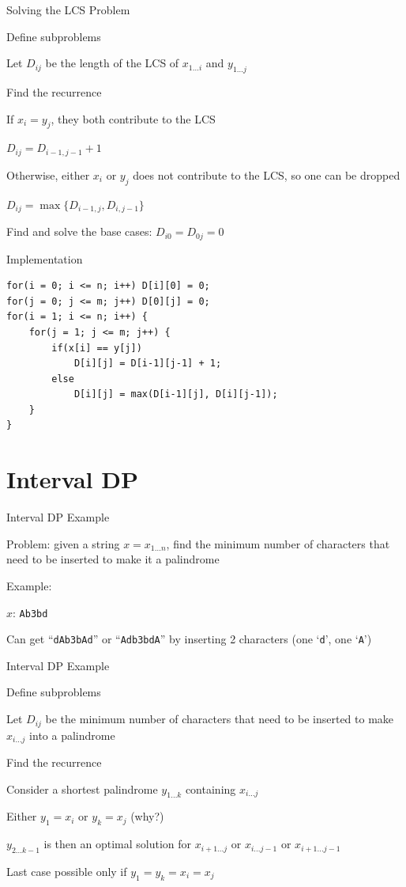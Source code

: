 \documentclass[13pt,onlymath]{beamer}
\begin{document}
\begin{frame}{Solving the LCS Problem}
\BIT
\item Define subproblems
\BIT
\item Let $D_{ij}$ be the length of the LCS of $x_{1\ldots i}$ and $y_{1\ldots j}$
\EIT
\item Find the recurrence
\BIT
\item If $x_i = y_j$, they both contribute to the LCS
\BIT
\item $D_{ij} = D_{i-1, j-1} + 1$
\EIT
\item Otherwise, either $x_i$ or $y_j$ does not contribute to the LCS, so one can be dropped
\BIT
\item $D_{ij} = \max\{D_{i-1,j}, D_{i, j-1}\}$
\EIT
\item Find and solve the base cases: $D_{i0} = D_{0j} = 0$
\EIT
\EIT
\end{frame}

\begin{frame}[fragile]{Implementation}
\begin{Verbatim}[xleftmargin=25pt]
for(i = 0; i <= n; i++) D[i][0] = 0;
for(j = 0; j <= m; j++) D[0][j] = 0;
for(i = 1; i <= n; i++) {
    for(j = 1; j <= m; j++) {
        if(x[i] == y[j])
            D[i][j] = D[i-1][j-1] + 1;
        else
            D[i][j] = max(D[i-1][j], D[i][j-1]);
    }
}
\end{Verbatim}
\end{frame}

\section{Interval DP}

\begin{frame}{Interval DP Example}
\BIT
\item Problem: given a string $x = x_{1\ldots n}$, find the minimum number of characters that need to be inserted to make it a palindrome
\vfill
\item Example:
\BIT
\item $x$: \texttt{Ab3bd}
\item Can get ``\texttt{dAb3bAd}'' or ``\texttt{Adb3bdA}'' by inserting 2 characters (one `\texttt d', one `\texttt A')
\EIT
\EIT
\end{frame}

\begin{frame}{Interval DP Example}
\BIT
\item Define subproblems
\BIT
\item Let $D_{ij}$ be the minimum number of characters that need to be inserted to make $x_{i\ldots j}$ into a palindrome
\EIT
\item Find the recurrence
\BIT
\item Consider a shortest palindrome $y_{1\ldots k}$ containing $x_{i\ldots j}$
\item Either $y_1 = x_i$ or $y_k = x_j$ (why?)
\item $y_{2 \ldots k-1}$ is then an optimal solution for $x_{i+1 \ldots j}$ or $x_{i \ldots j-1}$ or $x_{i+1 \ldots j-1}$
\BIT \item Last case possible only if $y_1 = y_k = x_i = x_j$ \EIT
\EIT
\EIT
\end{frame}
\end{document}
